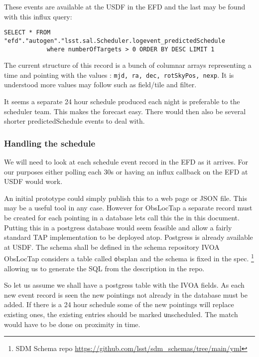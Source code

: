 These events are available at the USDF in the EFD and the last may be found with this influx query:
\begin{lstlisting}
SELECT * FROM "efd"."autogen"."lsst.sal.Scheduler.logevent_predictedSchedule
            where numberOfTargets > 0 ORDER BY DESC LIMIT 1
\end{lstlisting}

The current structure of this record is a bunch of columnar arrays representing a time and pointing with the
values : {\tt mjd, ra, dec, rotSkyPos, nexp}.
It is understood more values may follow such as field/tile and filter.


{\bftext It seems a separate 24 hour schedule produced each night is preferable to the scheduler team. This makes the forecast easy. There would then also be several shorter {\textt predictedSchedule} events to deal with. }

\subsubsection{Handling the schedule}
We will need to look at each schedule event record in the EFD as it arrives.
For our purposes either polling each 30s or having an influx callback on the EFD at USDF would
work.

An initial prototype could simply publish this to a web page or JSON file.
This may be a useful tool in any case.
However for ObsLocTap a separate record must be created for each pointing in a database lets call this the \DB in this document.
Putting this in a postgress database would seem feasible and allow a fairly standard TAP implementation to be deployed atop.
Postgress is already available at USDF.
The schema shall be  defined in the schema repository
IVOA ObsLocTap considers a table called {\texttt obsplan} and the schema is fixed in the spec.
\footnote{ SDM Schema repo \url{https://github.com/lsst/sdm_schemas/tree/main/yml}}
 allowing us to generate the SQL from the description in the repo.

So let us assume we shall have a postgress table with the IVOA fields.
As each new event record is seen the new pointings not already in the database must be added.
If there is a 24 hour schedule some of the new pointings will replace existing ones, the existing entries should be marked {\texttt unscheduled}.
The match would have to be done on proximity in time.

